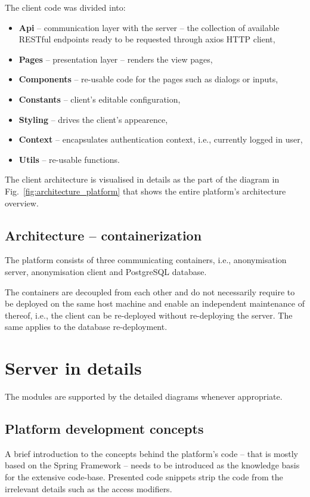 \documentclass[a4paper,twoside,12pt]{book}
\begin{document}
The client code was divided into:
\begin{itemize}
\item \textbf{Api} -- communication layer with the server -- the collection of available RESTful endpoints ready to be requested through axios HTTP client,
\item \textbf{Pages} -- presentation layer -- renders the view pages,
\item \textbf{Components} -- re-usable code for the pages such as dialogs or inputs, 
\item \textbf{Constants} -- client's editable configuration,
\item \textbf{Styling} -- drives the client's appearence,
\item \textbf{Context} -- encapsulates authentication context, i.e., currently logged in user,
\item \textbf{Utils} -- re-usable functions.
\end{itemize}

The client architecture is visualised in details as the part of the diagram in Fig.~\ref{fig:architecture_platform} that shows the entire platform's architecture overview.

\subsection{Architecture -- containerization}

The platform consists of three communicating containers, i.e., anonymisation server, anonymisation client and PostgreSQL database.

The containers are decoupled from each other and do not necessarily require to be deployed on the same host machine and enable an independent maintenance of thereof, i.e., the client can be re-deployed without re-deploying the server. The same applies to the database re-deployment.

\section{Server in details}

The modules are supported by the detailed diagrams whenever appropriate.

\subsection{Platform development concepts}

A brief introduction to the concepts behind the platform's code -- that is mostly based on the Spring Framework -- needs to be introduced as the knowledge basis for the extensive code-base. Presented code snippets strip the code from the irrelevant details such as the access modifiers.
\end{document}
